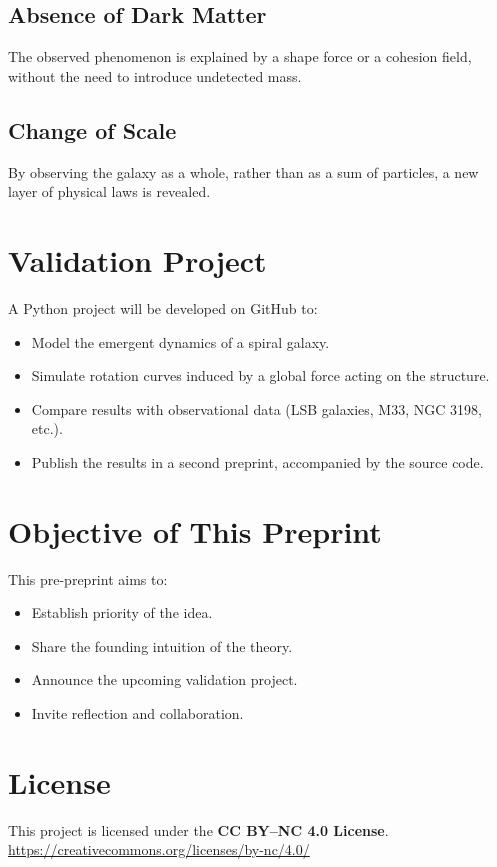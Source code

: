\documentclass[12pt,a4paper]{article}
\begin{document}
\subsection{Absence of Dark Matter}
The observed phenomenon is explained by a shape force or a cohesion field, without the need to introduce undetected mass.

\subsection{Change of Scale}
By observing the galaxy as a whole, rather than as a sum of particles, a new layer of physical laws is revealed.

\section{Validation Project}

A Python project will be developed on GitHub to:
\begin{itemize}
    \item Model the emergent dynamics of a spiral galaxy.
    \item Simulate rotation curves induced by a global force acting on the structure.
    \item Compare results with observational data (LSB galaxies, M33, NGC 3198, etc.).
    \item Publish the results in a second preprint, accompanied by the source code.
\end{itemize}

\section{Objective of This Preprint}

This pre-preprint aims to:
\begin{itemize}
    \item Establish priority of the idea.
    \item Share the founding intuition of the theory.
    \item Announce the upcoming validation project.
    \item Invite reflection and collaboration.
\end{itemize}

\section*{License}
This project is licensed under the \textbf{CC BY--NC 4.0 License}.\\
\url{https://creativecommons.org/licenses/by-nc/4.0/}
\end{document}
